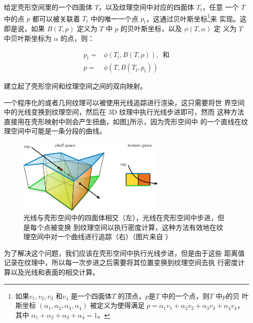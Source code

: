 给定壳形空间里的一个四面体 $T$，以及纹理空间中对应的四面体 $T_t$，任意 一个 $T$ 中的点 $p$ 都可以被关联着 $T_t$ 中的唯一一个点 $p_t$，这通过贝叶斯坐标\footnote{如果${v}_1,{v}_2,{v}_3$ 和${v}_4$ 是一个四面体$T$ 的顶点，$p$是$T$ 中的一个点，则$T$ 中$p$的贝 叶斯坐标 $(\alpha_1, \alpha_2, \alpha_3, \alpha_4)$ 被定义为使得满足 $p = \alpha_1{v}_1 + \alpha_2{v}_2 + \alpha_3{v}_3 + \alpha_4{v}_4$，其中 $\alpha_1 +\alpha_2 +\alpha_3 +\alpha_4 =1$。}来 实现。这即是说，如果 $B(T,p)$ 定义为 $T$ 中 $p$ 的贝叶斯坐标，以及 $\phi(T,\alpha)$ 定 义为 $T$ 中贝叶斯坐标为 $\alpha$ 的点，则：

\begin{equation}
\begin{aligned}
	{p}_t=&\phi(T_t,B(T,{p})) \text{,~~和}\\
	{p}=&\phi(T,B(T_t,{p}_t))
\end{aligned}
\end{equation}

\noindent 建立起了壳形空间和纹理空间之间的双向映射。

一个程序化的或者几何纹理可以被使用光线追踪进行渲染，这只需要将世 界空间中的光线变换到纹理空间，然后在 3D 纹理中执行光线步进即可，然而 这种方法直接用在壳形映射中则会产生扭曲，如图\ref{f:df-shell-maps-5}所示，因为壳形空间中 的一个直线在纹理空间中可能是一条分段的曲线。

\begin{figure}
\sidecaption
	\includegraphics[width=0.65\textwidth]{figures/df/shell-maps-5}
	\caption{光线与壳形空间中的四面体相交（左），光线在壳形空间中步进，但是每个点被变换 到纹理空间以执行密度计算，这种方法有效地在纹理空间中对一个曲线进行追踪（右）（图片来自 \cite{a:Shell-Maps}）}
	\label{f:df-shell-maps-5}
\end{figure}

为了解决这个问题，我们应该在壳形空间中执行光线步进，但是由于这些 距离值记录在纹理中，所以每一次步进之后需要将其位置变换到纹理空间去执 行密度计算以及光线和表面的相交计算。

